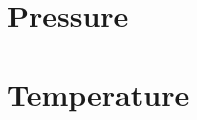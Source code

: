 \documentclass[12pt,oneside]{book}
\begin{document}
\clearpage


\section{Pressure}
\label{sec:pressure}


% 

% 
% 

\section{Temperature}
\label{sec:temperature}

\end{document}
